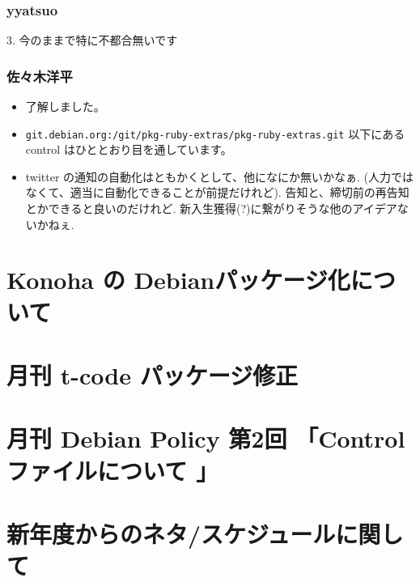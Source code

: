 \documentclass[cjk,dvipdfmx,12pt,%
hyperref={bookmarks=true,bookmarksnumbered=true,bookmarksopen=false,%
colorlinks=false,%
pdftitle={第 57 回 関西 Debian 勉強会},%
pdfauthor={倉敷・のがた・河田・佐々木},%
pdfsubject={資料},%
}]{beamer}
\begin{document}
\begin{frame}[fragile]
\frametitle{ yyatsuo }
  3. 今のままで特に不都合無いです
\end{frame}

\begin{frame}[fragile]
\frametitle{ 佐々木洋平 }
  \begin{itemize}
  \item 了解しました。
  \item {\scriptsize{\tt{git.debian.org:/git/pkg-ruby-extras/pkg-ruby-extras.git}}}
    以下にある control はひととおり目を通しています。
  \item twitter の通知の自動化はともかくとして、他になにか無いかなぁ.
    (人力ではなくて、適当に自動化できることが前提だけれど). 告知と、締切前の再告知とかできると良いのだけれど.
    新入生獲得(?)に繋がりそうな他のアイデアないかねぇ.
  \end{itemize}
\end{frame}


\section{Konoha の Debianパッケージ化について}



\section{月刊 t-code パッケージ修正}


\section{月刊 Debian Policy 第2回 「Controlファイルについて 」}

\section{新年度からのネタ/スケジュールに関して}
\end{document}
